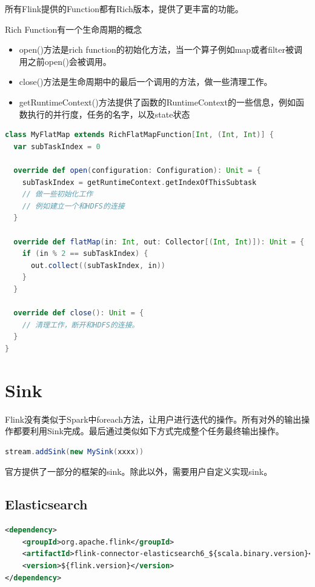 \documentclass[oneside]{ctexbook}
\begin{document}
所有Flink提供的Function都有Rich版本，提供了更丰富的功能。

Rich Function有一个生命周期的概念

\begin{itemize}
\item open()方法是rich function的初始化方法，当一个算子例如map或者filter被调用之前open()会被调用。
\item close()方法是生命周期中的最后一个调用的方法，做一些清理工作。
\item getRuntimeContext()方法提供了函数的RuntimeContext的一些信息，例如函数执行的并行度，任务的名字，以及state状态
\end{itemize}

\begin{lstlisting}[language=scala, breaklines]
class MyFlatMap extends RichFlatMapFunction[Int, (Int, Int)] {
  var subTaskIndex = 0

  override def open(configuration: Configuration): Unit = {
    subTaskIndex = getRuntimeContext.getIndexOfThisSubtask
    // 做一些初始化工作
    // 例如建立一个和HDFS的连接
  }

  override def flatMap(in: Int, out: Collector[(Int, Int)]): Unit = {
    if (in % 2 == subTaskIndex) {
      out.collect((subTaskIndex, in))
    }
  }

  override def close(): Unit = {
    // 清理工作，断开和HDFS的连接。
  }
}
\end{lstlisting}

\section{Sink}

Flink没有类似于Spark中foreach方法，让用户进行迭代的操作。所有对外的输出操作都要利用Sink完成。最后通过类似如下方式完成整个任务最终输出操作。

\begin{lstlisting}[language=scala]
stream.addSink(new MySink(xxxx)) 
\end{lstlisting}

官方提供了一部分的框架的sink。除此以外，需要用户自定义实现sink。   

\subsection{Elasticsearch}

\begin{lstlisting}[language=xml]
<dependency>
    <groupId>org.apache.flink</groupId>
    <artifactId>flink-connector-elasticsearch6_${scala.binary.version}</artifactId>
    <version>${flink.version}</version>
</dependency>
\end{lstlisting}
\end{document}
